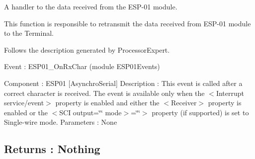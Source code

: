 A handler to the data received from the E\+S\+P-\/01 module. 

This function is responsible to retransmit the data received from E\+S\+P-\/01 module to the Terminal.

Follows the description generated by Processor\+Expert. 

 Event \+: E\+S\+P01\+\_\+\+On\+Rx\+Char (module E\+S\+P01\+Events)

Component \+: E\+S\+P01 \mbox{[}Asynchro\+Serial\mbox{]} Description \+: This event is called after a correct character is received. The event is available only when the $<$Interrupt service/event$>$ property is enabled and either the $<$\+Receiver$>$ property is enabled or the $<$\+S\+C\+I output=\char`\"{}\char`\"{} mode$>$=\char`\"{}\char`\"{}$>$ property (if supported) is set to Single-\/wire mode. Parameters \+: None \subsection*{Returns \+: Nothing }